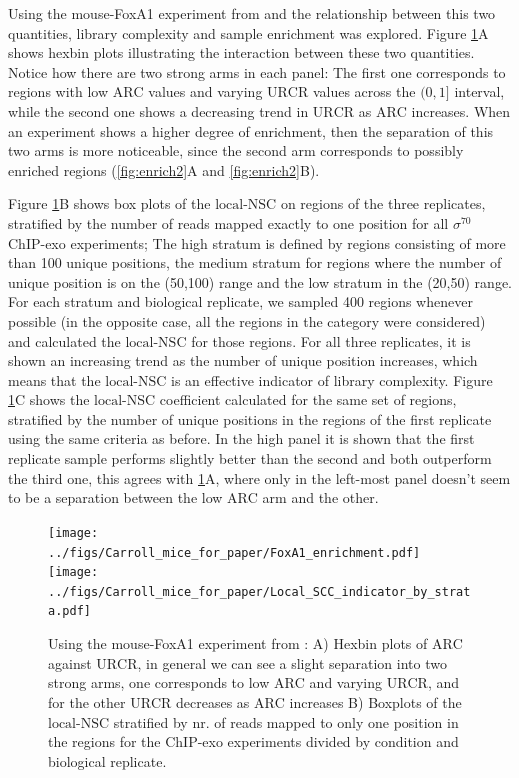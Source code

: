 \documentclass[11pt]{article}\usepackage[]{graphicx}\usepackage[]{color}
\begin{document}
Using the mouse-FoxA1 experiment from \cite{exoillumina} and the
relationship between this two quantities, library complexity and
sample enrichment was explored. Figure \ref{fig:enrich}A shows hexbin
plots illustrating the interaction between these two
quantities. Notice how there are two strong arms in each panel: The
first one corresponds to regions with low $\mbox{ARC}$ values and
varying $\mbox{URCR}$ values across the $(0,1]$ interval, while the
second one shows a decreasing trend in $\mbox{URCR}$ as $\mbox{ARC}$
increases. When an experiment shows a higher degree of enrichment,
then the separation of this two arms is more noticeable, since the
second arm corresponds to possibly enriched regions
(\ref{fig:enrich2}A and \ref{fig:enrich2}B).



Figure \ref{fig:enrich}B shows box plots of the $\mbox{local-NSC}$ on
regions of the three replicates, stratified by the number of reads
mapped exactly to one position for all $\sigma^{70}$ ChIP-exo
experiments; The high stratum is defined by regions consisting of more
than 100 unique positions, the medium stratum for regions
where the number of unique position is on the
(50,100) range and the low stratum in the
(20,50) range. For each stratum and biological
replicate, we sampled 400 regions whenever possible (in the
opposite case, all the regions in the category were considered) and
calculated the $\mbox{local-NSC}$ for those regions. For all three
replicates, it is shown an increasing trend as the number of unique
position increases, which means that the $\mbox{local-NSC}$ is an
effective indicator of library complexity. Figure \ref{fig:enrich}C
shows the $\mbox{local-NSC}$ coefficient calculated for the same set
of regions, stratified by the number of unique positions in the
regions of the first replicate using the same criteria as before. In
the high panel it is shown that the first replicate sample performs
slightly better than the second and both outperform the third one,
this agrees with \ref{fig:enrich}A, where only in the left-most panel
doesn't seem to be a separation between the low $\mbox{ARC}$ arm and
the other.

\begin{figure}[H]
  \centering
  \texttt{[image: ../figs/Carroll\_mice\_for\_paper/FoxA1\_enrichment.pdf]}
  \texttt{[image: ../figs/Carroll\_mice\_for\_paper/Local\_SCC\_indicator\_by\_strata.pdf]}
  \caption{Using the mouse-FoxA1 experiment from \cite{exoillumina}:
    A) Hexbin plots of $\mbox{ARC}$ against $\mbox{URCR}$, in general
    we can see a slight separation into two strong arms, one
    corresponds to low $\mbox{ARC}$ and varying $\mbox{URCR}$, and for
    the other $\mbox{URCR}$ decreases as $\mbox{ARC}$ increases B)
    Boxplots of the $\mbox{local-NSC}$ stratified by nr. of reads
    mapped to only one position in the regions for the ChIP-exo
    experiments divided by condition and biological replicate.}
  \label{fig:enrich}
\end{figure}
\end{document}
